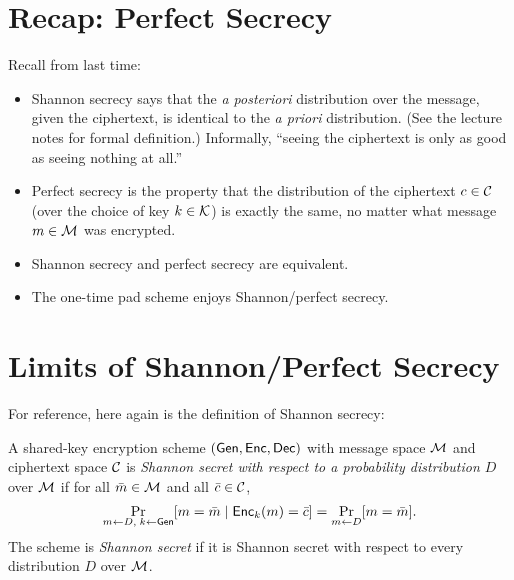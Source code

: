 \documentclass[11pt]{article}
\begin{document}
\thispagestyle{fancy}           %


\section{Recap: Perfect Secrecy}
\label{sec:recap:-perf-secr}

Recall from last time: 
\begin{itemize}
\item Shannon secrecy says that the \textit{a posteriori} distribution
  over the message, given the ciphertext, is identical to the
  \textit{a priori} distribution.  (See the lecture notes for formal
  definition.)  Informally, ``seeing the ciphertext is only as good as
  seeing nothing at all.''
\item Perfect secrecy is the property that the distribution of the
  ciphertext $c \in \mathcal{C}$ (over the choice of key $k \in
  \mathcal{K}$) is exactly the same, no matter what message $m
  \in \mathcal{M}$ was encrypted.
\item Shannon secrecy and perfect secrecy are equivalent.
\item The one-time pad scheme enjoys Shannon/perfect secrecy.
\end{itemize}

\section{Limits of Shannon/Perfect Secrecy}
\label{sec:limits-perf-secr}

For reference, here again is the definition of Shannon secrecy:

\begin{definition}
  \label{def:shannon-secrecy}
  A shared-key encryption scheme $(\mathsf{Gen},\mathsf{Enc},\mathsf{Dec})$ with
  message space $\mathcal{M}$ and ciphertext space $\mathcal{C}$ is
  \emph{Shannon secret with respect to a probability distribution $D$}
  over $\mathcal{M}$ if for all $\bar{m} \in \mathcal{M}$ and all $\bar{c}
  \in \mathcal{C}$,
  \begin{equation}
    \label{eq:shannon}
    \Pr_{m \gets D,\; k \gets \mathsf{Gen}}[m = \bar{m}\; |\;
    \mathsf{Enc}_{k}(m) = \bar{c} ] = \Pr_{m \gets D}[ m = \bar{m} ].
  \end{equation}
  The scheme is \emph{Shannon secret} if it is Shannon secret with
  respect to every distribution $D$ over $\mathcal{M}$.
\end{definition}
\end{document}
